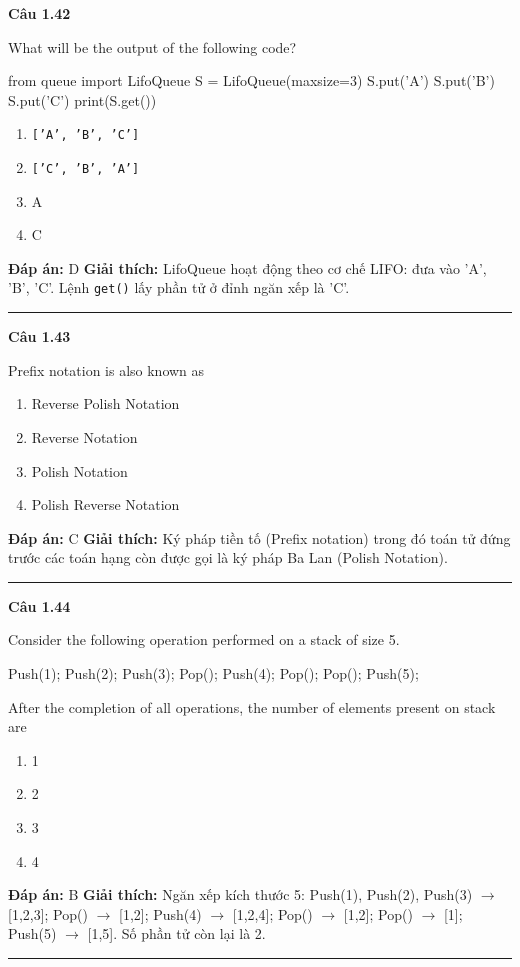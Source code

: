 \documentclass[11pt,a4paper]{article}
\newenvironment{question}[1]{%
  \par\vspace{1em}\noindent\textbf{\large Câu #1}\par\vspace{0.4em}
}{%
  \par\vspace{1em}\hrule\vspace{0.6em}
}
\newenvironment{choices}{%
  \begin{enumerate}[label=\textbf{\Alph*.},leftmargin=2.2em,itemsep=2pt,topsep=3pt]
}{%
  \end{enumerate}
}
\newcommand{\choice}{\item}
\newenvironment{codebox}{%
  \begin{tcolorbox}[colback=gray!8!white,colframe=gray!50!black,arc=1.5mm,boxrule=0.6pt,left=3mm,right=3mm,top=2.5mm,bottom=2.5mm]
  \ttfamily\small
}{%
  \end{tcolorbox}
}
\begin{document}
\begin{question}{1.42}
What will be the output of the following code?
\begin{codebox}
from queue import LifoQueue
S = LifoQueue(maxsize=3)
S.put('A')
S.put('B')
S.put('C')
print(S.get())
\end{codebox}
\begin{choices}
\choice \texttt{['A', 'B', 'C']}
\choice \texttt{['C', 'B', 'A']}
\choice A
\choice C
\end{choices}
\textbf{Đáp án:} D
\textbf{Giải thích:} LifoQueue hoạt động theo cơ chế LIFO: đưa vào 'A', 'B', 'C'. Lệnh \texttt{get()} lấy phần tử ở đỉnh ngăn xếp là 'C'.
\end{question}

\begin{question}{1.43}
Prefix notation is also known as
\begin{choices}
\choice Reverse Polish Notation
\choice Reverse Notation
\choice Polish Notation
\choice Polish Reverse Notation
\end{choices}
\textbf{Đáp án:} C
\textbf{Giải thích:} Ký pháp tiền tố (Prefix notation) trong đó toán tử đứng trước các toán hạng còn được gọi là ký pháp Ba Lan (Polish Notation).
\end{question}

\begin{question}{1.44}
Consider the following operation performed on a stack of size 5.
\begin{codebox}
Push(1);
Push(2);
Push(3);
Pop();
Push(4);
Pop();
Pop();
Push(5);
\end{codebox}
After the completion of all operations, the number of elements present on stack are
\begin{choices}
\choice 1
\choice 2
\choice 3
\choice 4
\end{choices}
\textbf{Đáp án:} B
\textbf{Giải thích:} Ngăn xếp kích thước 5: Push(1), Push(2), Push(3) $\to$ [1,2,3]; Pop() $\to$ [1,2]; Push(4) $\to$ [1,2,4]; Pop() $\to$ [1,2]; Pop() $\to$ [1]; Push(5) $\to$ [1,5]. Số phần tử còn lại là 2.
\end{question}
\end{document}
